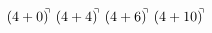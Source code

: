 \documentclass[preview]{standalone}
\begin{document}
\begin{align*}
(4+0)^{\hspace{-0.1cm}\urcorner} \ (4+4)^{\hspace{-0.1cm}\urcorner} \ (4+6)^{\hspace{-0.1cm}\urcorner} \ (4+10)^{\hspace{-0.1cm}\urcorner}
\end{align*}
\end{document}

